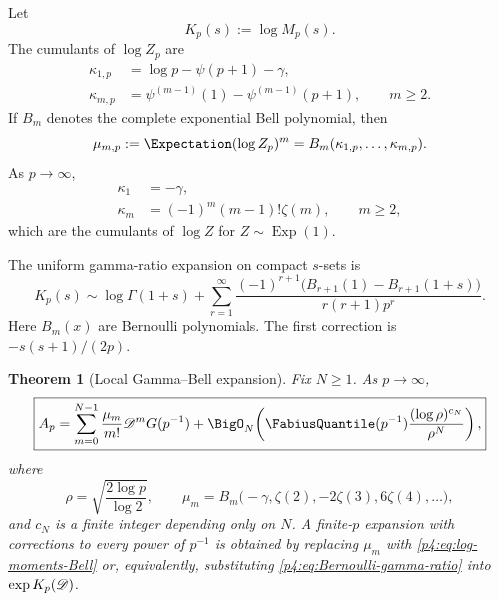 \documentclass[11pt,oneside]{article}
\newtheorem{theorem}{Theorem}[section]
\theoremstyle{definition}
\theoremstyle{remark}
\begin{document}
Let
\begin{equation}
 K_p(s):=\log M_p(s).
 \label{p4:eq:Kp}
\end{equation}
The cumulants of $\log Z_p$ are
\begin{align}
 \kappa_{1,p}&=\log p-\psi(p+1)-\gamma,
 \label{p4:eq:kappa1p}\\
 \kappa_{m,p}&=\psi^{(m-1)}(1)-\psi^{(m-1)}(p+1),
 \qquad m\geq2.
 \label{p4:eq:kappamp}
\end{align}
If $B_m$ denotes the complete exponential Bell polynomial, then
\begin{equation}
 \mu_{m,p}:=\Expectation(\log Z_p)^m
 =B_m(\kappa_{1,p},\ldots,\kappa_{m,p}).
 \label{p4:eq:log-moments-Bell}
\end{equation}
As $p\to\infty$,
\begin{align}
 \kappa_1&=-\gamma,\label{p4:eq:kappa-limit-1}\\
 \kappa_m&=(-1)^m(m-1)!\zeta(m),\qquad m\geq2,
 \label{p4:eq:kappa-limit-m}
\end{align}
which are the cumulants of $\log Z$ for $Z\sim\operatorname{Exp}(1)$.

The uniform gamma-ratio expansion on compact $s$-sets is
\begin{equation}
 \boxed{
 K_p(s)\sim\log\Gamma(1+s)
 +\sum_{r=1}^{\infty}
 \frac{(-1)^{r+1}\bigl(B_{r+1}(1)-B_{r+1}(1+s)\bigr)}
 {r(r+1)p^r}.}
 \label{p4:eq:Bernoulli-gamma-ratio}
\end{equation}
Here $B_m(x)$ are Bernoulli polynomials.  The first correction is
$-s(s+1)/(2p)$.

\begin{theorem}[Local Gamma--Bell expansion]
\label{p4:thm:Gamma-Bell-expansion}
Fix $N\geq1$.  As $p\to\infty$,
\begin{equation}
 \boxed{
 A_p=
 \sum_{m=0}^{N-1}\frac{\mu_m}{m!}
 \Dop^mG(p^{-1})
 +\BigO_{N}\!\left(
 \FabiusQuantile(p^{-1})\frac{(\log\rho)^{c_N}}{\rho^N}
 \right),}
 \label{p4:eq:Gamma-Bell-expansion}
\end{equation}
where
\begin{equation}
 \rho=\sqrt{\frac{2\log p}{\log2}},
 \qquad
 \mu_m=B_m\bigl(-\gamma,\zeta(2),-2\zeta(3),6\zeta(4),\ldots\bigr),
 \label{p4:eq:mu-limit}
\end{equation}
and $c_N$ is a finite integer depending only on $N$.
A finite-$p$ expansion with corrections to every power of $p^{-1}$ is obtained by replacing
$\mu_m$ with \eqref{p4:eq:log-moments-Bell} or, equivalently, substituting
\eqref{p4:eq:Bernoulli-gamma-ratio} into $\exp K_p(\mathscr D)$.
\end{theorem}
\end{document}
